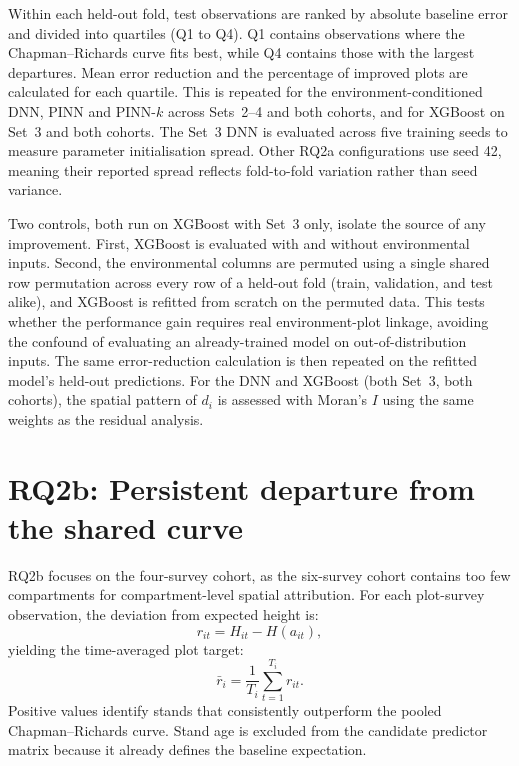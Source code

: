 \documentclass[logo,msc,ai]{infthesis}           %
\begin{document}
Within each held-out fold, test observations are ranked by absolute baseline error and divided into quartiles (Q1 to Q4). Q1 contains observations where the Chapman--Richards curve fits best, while Q4 contains those with the largest departures. Mean error reduction and the percentage of improved plots are calculated for each quartile. This is repeated for the environment-conditioned DNN, PINN and PINN-$k$ across Sets~2--4 and both cohorts, and for XGBoost on Set~3 and both cohorts. The Set~3 DNN is evaluated across five training seeds to measure parameter initialisation spread. Other RQ2a configurations use seed 42, meaning their reported spread reflects fold-to-fold variation rather than seed variance.

Two controls, both run on XGBoost with Set~3 only, isolate the source of any improvement. First, XGBoost is evaluated with and without environmental inputs. Second, the environmental columns are permuted using a single shared row permutation across every row of a held-out fold (train, validation, and test alike), and XGBoost is refitted from scratch on the permuted data. This tests whether the performance gain requires real environment-plot linkage, avoiding the confound of evaluating an already-trained model on out-of-distribution inputs. The same error-reduction calculation is then repeated on the refitted model's held-out predictions. For the DNN and XGBoost (both Set~3, both cohorts), the spatial pattern of $d_i$ is assessed with Moran's $I$ using the same weights as the residual analysis.

\section{RQ2b: Persistent departure from the shared curve}

RQ2b focuses on the four-survey cohort, as the six-survey cohort contains too few compartments for compartment-level spatial attribution. For each plot-survey observation, the deviation from expected height is:
\begin{equation}
r_{it}=H_{it}-H(a_{it}),
\end{equation}
yielding the time-averaged plot target:
\begin{equation}
\bar r_i=\frac{1}{T_i}\sum_{t=1}^{T_i}r_{it}.
\label{eq:mean-cr-residual}
\end{equation}
Positive values identify stands that consistently outperform the pooled Chapman--Richards curve. Stand age is excluded from the candidate predictor matrix because it already defines the baseline expectation.
\end{document}
